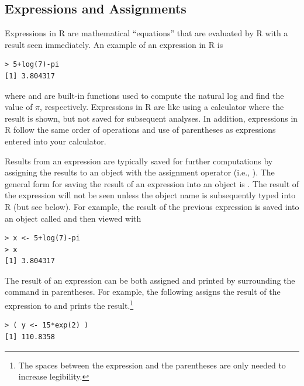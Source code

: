 \documentclass[10pt,openany]{book}\usepackage[]{graphicx}\usepackage[]{color}
\makeatletter
\newenvironment{kframe}{%
 \def\at@end@of@kframe{}%
 \ifinner\ifhmode%
  \def\at@end@of@kframe{\end{minipage}}%
  \begin{minipage}{\columnwidth}%
 \fi\fi%
 \def\FrameCommand##1{\hskip\@totalleftmargin \hskip-\fboxsep
 \colorbox{shadecolor}{##1}\hskip-\fboxsep
     \hskip-\linewidth \hskip-\@totalleftmargin \hskip\columnwidth}%
 \MakeFramed {\advance\hsize-\width
   \@totalleftmargin\z@ \linewidth\hsize
   \@setminipage}}%
 {\par\unskip\endMakeFramed%
 \at@end@of@kframe}
\newenvironment{knitrout}{}{} %
\makeatother
\begin{document}
\subsection{Expressions and Assignments} \label{sect:RExprAssn}
Expressions in R are mathematical ``equations'' that are evaluated by R with a result seen immediately. An example of an expression in R is
\begin{knitrout}
\color{fgcolor}\begin{kframe}
\begin{verbatim}
> 5+log(7)-pi
[1] 3.804317
\end{verbatim}
\end{kframe}
\end{knitrout}

where  and  are built-in functions used to compute the natural log and find the value of $\pi$, respectively. Expressions in R are like using a calculator where the result is shown, but not saved for subsequent analyses. In addition, expressions in R follow the same order of operations and use of parentheses as expressions entered into your calculator.

Results from an expression are typically saved for further computations by assigning the results to an object with the assignment operator (i.e., \R{<-}). The general form for saving the result of an expression into an object is . The result of the expression will not be seen unless the object name is subsequently typed into R (but see below). For example, the result of the previous expression is saved into an object called  and then viewed with
\begin{knitrout}
\color{fgcolor}\begin{kframe}
\begin{verbatim}
> x <- 5+log(7)-pi
> x
[1] 3.804317
\end{verbatim}
\end{kframe}
\end{knitrout}
The result of an expression can be both assigned and printed by surrounding the command in parentheses. For example, the following assigns the result of the expression to  and prints the result.\footnote{The spaces between the expression and the parentheses are only needed to increase legibility.}
\begin{knitrout}
\color{fgcolor}\begin{kframe}
\begin{verbatim}
> ( y <- 15*exp(2) )
[1] 110.8358
\end{verbatim}
\end{kframe}
\end{knitrout}
\end{document}
